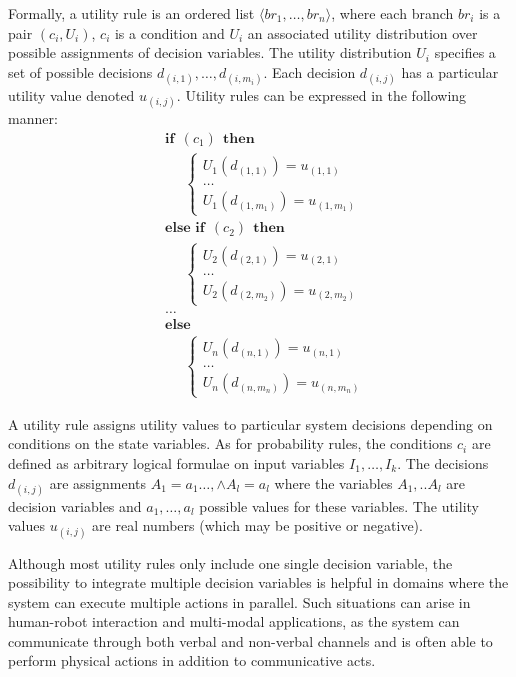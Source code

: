 Formally, a utility rule is an ordered list $\langle br_1, \dots, br_n\rangle$, where each branch $br_i$ is a pair $(c_i, U_i)$, $c_i$ is a condition and $U_i$ an associated utility distribution over possible assignments of decision variables. The utility distribution $U_i$ specifies a set of possible decisions $d_{(i,1)}, \dots, d_{(i,m_i)}$.  Each decision $d_{(i,j)}$ has a particular utility value denoted $u_{(i,j)}$.  Utility rules can be expressed in the following manner:
\begin{equation}
\begin{aligned}
& \textbf{if} \ \ (c_{1}) \ \ \textbf{then} \\ 
& \;\;\;\;\; \begin{cases}
U_1(d_{(1,1)}) = u_{(1,1)} \\
 \dots \\
U_1(d_{(1,m_1)}) = u_{(1,m_1)} 
\end{cases} \\[3mm]
& \textbf{else if} \ \ (c_{2}) \ \ \textbf{then} \\ 
& \;\;\;\;\; \begin{cases}
U_2(d_{(2,1)}) = u_{(2,1)} \\
 \dots \\
U_2(d_{(2,m_2)}) = u_{(2,m_2)} 
\end{cases} \\
& \dots  \\
& \textbf{else} \\
& \;\;\;\;\; \begin{cases}
U_n(d_{(n,1)}) = u_{(n,1)} \\
 \dots \\
U_n(d_{(n,m_n)}) = u_{(n,m_n)}
\end{cases}
\end{aligned}
\end{equation}

A utility rule assigns utility values to particular system decisions depending on conditions on the state variables.  As for probability rules, the conditions $c_i$ are defined as arbitrary logical formulae on input variables $I_1, \dots, I_k$.  The decisions $d_{(i,j)}$ are assignments $A_1\!=\!a_1 \dots, \land A_{l}\!=\!a_{l}$ where the variables $A_1,..A_{l}$ are decision variables and $a_1, \dots, a_{l}$ possible values for these variables. The utility values $u_{(i,j)}$ are real numbers (which may be positive or negative).  

Although most utility rules only include one single decision variable, the possibility to integrate multiple decision variables is helpful in domains where the system can execute multiple actions in parallel. Such situations can arise in human-robot interaction and multi-modal applications, as the system can communicate through both verbal and non-verbal channels and is often able to perform physical actions in addition to communicative acts. 
 
